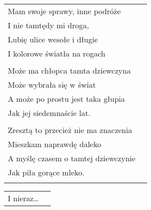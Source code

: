 \documentclass[a5paper]{article}
\begin{document}
\noindent
\begin{tabular}{@{}p{8.5cm}p{3cm}@{}}
Mam swoje sprawy, inne podróże\\
I nie tamtędy mi droga,\\
Lubię ulice wesołe i długie\\
I kolorowe światła na rogach\\\\

Może ma chłopca tamta dziewczyna\\
Może wybrała się w świat\\
A może po prostu jest taka głupia\\
Jak jej siedemnaście lat.\\\\

Zresztą to przecież nie ma znaczenia\\
Mieszkam naprawdę daleko\\
A myślę czasem o tamtej dziewczynie\\
Jak piła gorące mleko.\\\\
\end{tabular}

\noindent
\begin{tabular}{@{}p{8.5cm}p{3cm}@{}}
I nieraz…
\end{tabular}
\end{document}
